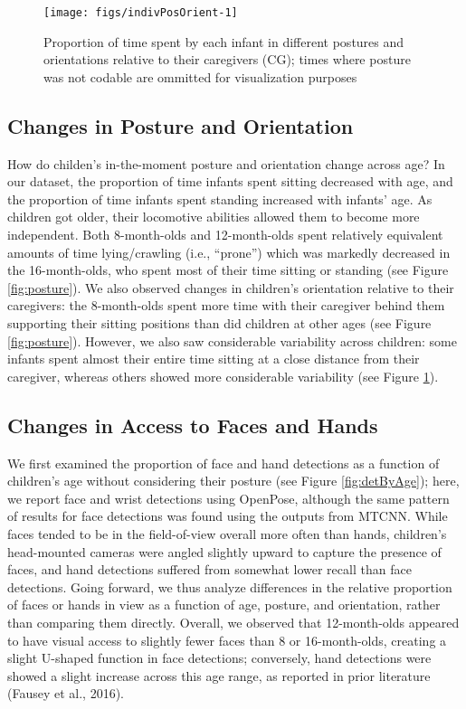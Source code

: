 \documentclass[english,man,floatsintext]{apa6}
\begin{document}
\begin{figure}[!h]

{\centering \texttt{[image: figs/indivPosOrient-1]} 

}

\caption{Proportion of time spent by each infant in different postures and orientations relative to their caregivers (CG); times where posture was not codable are ommitted for visualization purposes}\label{fig:indivPosOrient}
\end{figure}

\subsection{Changes in Posture and
Orientation}\label{changes-in-posture-and-orientation}

How do childen's in-the-moment posture and orientation change across
age? In our dataset, the proportion of time infants spent sitting
decreased with age, and the proportion of time infants spent standing
increased with infants' age. As children got older, their locomotive
abilities allowed them to become more independent. Both 8-month-olds and
12-month-olds spent relatively equivalent amounts of time lying/crawling
(i.e., \enquote{prone}) which was markedly decreased in the
16-month-olds, who spent most of their time sitting or standing (see
Figure \ref{fig:posture}). We also observed changes in children's
orientation relative to their caregivers: the 8-month-olds spent more
time with their caregiver behind them supporting their sitting positions
than did children at other ages (see Figure \ref{fig:posture}). However,
we also saw considerable variability across children: some infants spent
almost their entire time sitting at a close distance from their
caregiver, whereas others showed more considerable variability (see
Figure \ref{fig:indivPosOrient}).

\subsection{Changes in Access to Faces and
Hands}\label{changes-in-access-to-faces-and-hands}

We first examined the proportion of face and hand detections as a
function of children's age without considering their posture (see Figure
\ref{fig:detByAge}); here, we report face and wrist detections using
OpenPose, although the same pattern of results for face detections was
found using the outputs from MTCNN. While faces tended to be in the
field-of-view overall more often than hands, children's head-mounted
cameras were angled slightly upward to capture the presence of faces,
and hand detections suffered from somewhat lower recall than face
detections. Going forward, we thus analyze differences in the relative
proportion of faces or hands in view as a function of age, posture, and
orientation, rather than comparing them directly. Overall, we observed
that 12-month-olds appeared to have visual access to slightly fewer
faces than 8 or 16-month-olds, creating a slight U-shaped function in
face detections; conversely, hand detections were showed a slight
increase across this age range, as reported in prior literature (Fausey
et al., 2016).
\end{document}
